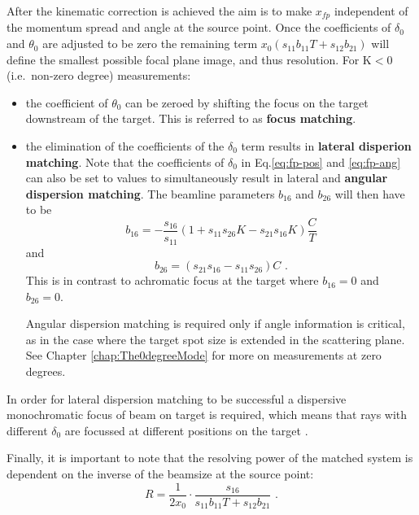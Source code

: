 \documentclass[11pt]{report}
\begin{document}
After the kinematic correction is achieved
the aim is to make $x_{fp}$ independent of the momentum spread and angle at the source point.
Once the coefficients of $\delta_0$ and $\theta_0$ are adjusted to be zero the remaining term 
$x_{0}(s_{11}b_{11}T+s_{12}b_{21})$ will define the smallest possible focal plane
image, and thus resolution. For K$<$0 (i.e.~non-zero degree) measurements:
\begin{itemize}
\item the coefficient of $\theta_0$ can be zeroed by shifting the focus on the target downstream of the target. 
This is referred to as {\bf focus matching}. 
\item the elimination of the coefficients of the $\delta_0$ term results in {\bf lateral disperion matching}. 
Note that the coefficients of $\delta_0$ in Eq.\ref{eq:fp-pos} and \ref{eq:fp-ang} can also be set to values to 
simultaneously result in lateral and {\bf angular dispersion matching}. 
The beamline parameters $b_{16}$ and $b_{26}$ will then have to be
\begin{equation} 
b_{16}=-\frac{s_{16}}{s_{11}}(1+s_{11}s_{26}K-s_{21}s_{16}K)\frac{C}{T} \label{eq:lateral-DM-1} 
\end{equation} 
and
\begin{equation} 
b_{26}=(s_{21}s_{16}-s_{11}s_{26})C \label{eq:lateral-DM-2} \textrm{       .}
\end{equation} 
This is in contrast to achromatic focus at the target where $b_{16}=0$ and $b_{26}=0$.

Angular dispersion matching is required 
only if angle information is critical, as in the case where the target spot size is extended in the scattering plane. 
See Chapter \ref{chap:The0degreeMode} for more on measurements at zero degrees.


\end{itemize}

In order for lateral dispersion matching to be successful 
a dispersive monochromatic focus of beam on target is required, which means
that rays with different $\delta_0$ are focussed at different positions on the target \cite{Fuj02}. %


Finally, it is important to note that the resolving power of the matched system is dependent on the inverse of the beamsize at the source point:
\begin{equation}
R=\frac{1}{2x_0}\cdot \frac{s_{16}} {s_{11}b_{11}T+s_{12}b_{21} }  \textrm{      .}
\end{equation}
\end{document}
